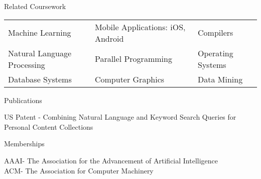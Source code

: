 \documentclass{resume}
\begin{document}

\begin{relatedCoursework}
\begin{rSection}{Related Coursework}
\begin{tabularx}{\textwidth}{ X X X }
Machine Learning & Mobile Applications: iOS, Android & Compilers \\
Natural Language Processing & Parallel Programming & Operating Systems \\
Database Systems & Computer Graphics & Data Mining \\
\end{tabularx}

\end{rSection}
\end{relatedCoursework}


\begin{publications}
\begin{rSection}{Publications }

US Patent - Combining Natural Language and Keyword Search Queries for Personal Content Collections

\end{rSection}
\end{publications}


\begin{sectionMemberships}
\begin{rSection}{Memberships}

AAAI- The Association for the Advancement of Artificial Intelligence \\
ACM- The Association for Computer Machinery

\end{rSection}
\end{sectionMemberships}
\end{document}
